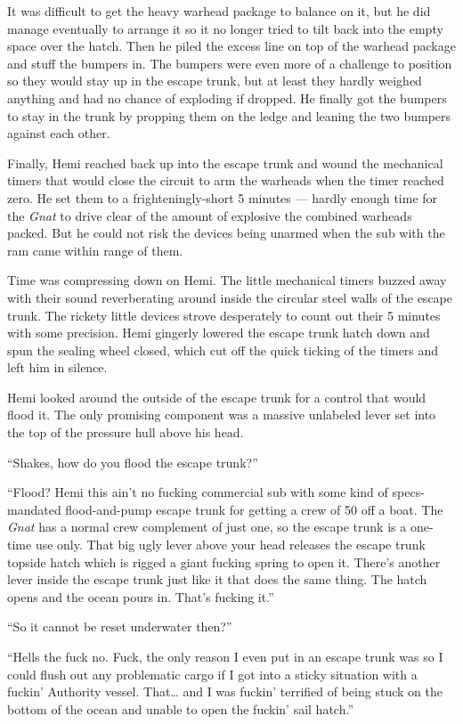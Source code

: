 \documentclass[
]{scrbook}
\begin{document}
It was difficult to get the heavy warhead package to balance on it, but
he did manage eventually to arrange it so it no longer tried to tilt
back into the empty space over the hatch. Then he piled the excess line
on top of the warhead package and stuff the bumpers in. The bumpers were
even more of a challenge to position so they would stay up in the escape
trunk, but at least they hardly weighed anything and had no chance of
exploding if dropped. He finally got the bumpers to stay in the trunk by
propping them on the ledge and leaning the two bumpers against each
other.

Finally, Hemi reached back up into the escape trunk and wound the
mechanical timers that would close the circuit to arm the warheads when
the timer reached zero. He set them to a frighteningly-short 5 minutes
--- hardly enough time for the \emph{Gnat} to drive clear of the amount
of explosive the combined warheads packed. But he could not risk the
devices being unarmed when the sub with the ram came within range of
them.

Time was compressing down on Hemi. The little mechanical timers buzzed
away with their sound reverberating around inside the circular steel
walls of the escape trunk. The rickety little devices strove desperately
to count out their 5 minutes with some precision. Hemi gingerly lowered
the escape trunk hatch down and spun the sealing wheel closed, which cut
off the quick ticking of the timers and left him in silence.

Hemi looked around the outside of the escape trunk for a control that
would flood it. The only promising component was a massive unlabeled
lever set into the top of the pressure hull above his head.

``Shakes, how do you flood the escape trunk?''

``Flood? Hemi this ain't no fucking commercial sub with some kind of
specs-mandated flood-and-pump escape trunk for getting a crew of 50 off
a boat. The \emph{Gnat} has a normal crew complement of just one, so the
escape trunk is a one-time use only. That big ugly lever above your head
releases the escape trunk topside hatch which is rigged a giant fucking
spring to open it. There's another lever inside the escape trunk just
like it that does the same thing. The hatch opens and the ocean pours
in. That's fucking it.''

``So it cannot be reset underwater then?''

``Hells the fuck no. Fuck, the only reason I even put in an escape trunk
was so I could flush out any problematic cargo if I got into a sticky
situation with a fuckin' Authority vessel. That\ldots{} and I was
fuckin' terrified of being stuck on the bottom of the ocean and unable
to open the fuckin' sail hatch.''
\end{document}
